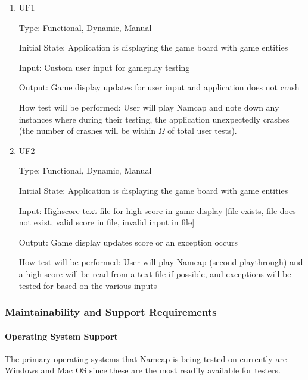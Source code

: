 \documentclass[12pt, titlepage]{article}
\begin{document}
\begin{enumerate}

\item{UF1\\}

Type: Functional, Dynamic, Manual
					
Initial State: Application is displaying the game board with game entities
					
Input: Custom user input for gameplay testing
					
Output: Game display updates for user input and application does not crash
					
How test will be performed: User will play Namcap and note down any instances where during their testing, the application unexpectedly crashes (the number of crashes will be within $\hyperref[tab:constants]{\Omega}$ of total user tests).

\item{UF2\\}

Type: Functional, Dynamic, Manual
					
Initial State: Application is displaying the game board with game entities
					
Input: Highscore text file for high score in game display [file exists, file does not exist, valid score in file, invalid input in file]
					
Output: Game display updates score or an exception occurs
					
How test will be performed: User will play Namcap (second playthrough) and a high score will be read from a text file if possible, and exceptions will be tested for based on the various inputs

\end{enumerate}

\subsubsection{Maintainability and Support Requirements}

\paragraph{Operating System Support\\}
The primary operating systems that Namcap is being tested on currently are Windows and Mac OS since these are the most readily available for testers.
\end{document}
